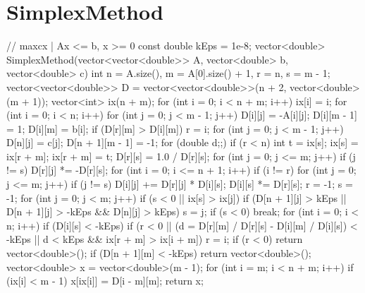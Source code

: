 \documentclass[12pt, titlepage]{article}
\begin{document}
\section{SimplexMethod}
\begin{cppcode}
// max{cx | Ax <= b, x >= 0}
const double kEps = 1e-8;
vector<double> SimplexMethod(vector<vector<double>> A, vector<double> b, vector<double> c) {
               int n = A.size(), m = A[0].size() + 1, r = n, s = m - 1;
    vector<vector<double>> D = vector<vector<double>>(n + 2, vector<double>(m + 1));
    vector<int> ix(n + m);
    for (int i = 0; i < n + m; i++) ix[i] = i;
    for (int i = 0; i < n; i++) {
        for (int j = 0; j < m - 1; j++) D[i][j] = -A[i][j];
        D[i][m - 1] = 1;
        D[i][m] = b[i];
        if (D[r][m] > D[i][m]) r = i;
    }
    for (int j = 0; j < m - 1; j++) D[n][j] = c[j];
    D[n + 1][m - 1] = -1;
    for (double d;;) {
        if (r < n) {
            int t = ix[s]; ix[s] = ix[r + m]; ix[r + m] = t;
            D[r][s] = 1.0 / D[r][s];
            for (int j = 0; j <= m; j++) if (j != s) D[r][j] *= -D[r][s];
            for (int i = 0; i <= n + 1; i++) if (i != r) {
                for (int j = 0; j <= m; j++) if (j != s) D[i][j] += D[r][j] * D[i][s];
                D[i][s] *= D[r][s];
            }
        }
        r = -1; s = -1;
        for (int j = 0; j < m; j++) if (s < 0 || ix[s] > ix[j]) {
            if (D[n + 1][j] > kEps || D[n + 1][j] > -kEps && D[n][j] > kEps) s = j;
        }
        if (s < 0) break;
        for (int i = 0; i < n; i++) if (D[i][s] < -kEps) {
            if (r < 0 || (d = D[r][m] / D[r][s] - D[i][m] / D[i][s]) < -kEps
                || d < kEps && ix[r + m] > ix[i + m]) r = i;
        }
        if (r < 0) return vector<double>();
    }
    if (D[n + 1][m] < -kEps) return vector<double>();
    vector<double> x = vector<double>(m - 1);
    for (int i = m; i < n + m; i++) if (ix[i] < m - 1) x[ix[i]] = D[i - m][m];
    return x;
}
\end{cppcode}
\end{document}
